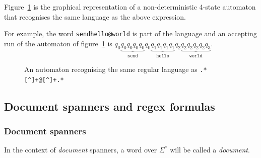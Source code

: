 \documentclass[11px]{article}
\theoremstyle{definition}
\begin{document}
        Figure~\ref{fig:automata_simple} is the graphical representation of a
        non-deterministic 4-state automaton that recognises the same language
        as the above expression.

        For example, the word \texttt{send{\textvisiblespace}hello@world} is
        part of the language and an accepting run of the automaton of
        figure~\ref{fig:automata_simple} is $q_0 \underbrace{q_0 q_0 q_0
        q_0}_\texttt{send} q_0 \underbrace{q_1q_1q_1q_1}_\texttt{hello} q_2
        \underbrace{q_2 q_2 q_2 q_2 q_3}_\texttt{world}$.

        \begin{figure}[ht]
          \centering
          \caption{%
            An automaton recognising the same regular language as
            \texttt{.*[\textasciicircum\textvisiblespace]+@[\textasciicircum\textvisiblespace]+.*}
          }%
          \label{fig:automata_simple}
        \end{figure}

    \subsection{Document spanners and regex formulas}

      \subsubsection{Document spanners}

        In the context of \textit{document} spanners, a word over $\Sigma^*$
        will be called a \textit{document}.
\end{document}
